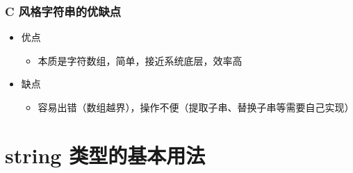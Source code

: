 \begin{frame}[fragile]
    \frametitle{C 风格字符串的优缺点}

    \begin{itemize}
        \item 优点
        
        \begin{itemize}
            \item 本质是字符数组，简单，接近系统底层，效率高
        \end{itemize}

        \item 缺点
        
        \begin{itemize}
            \item 容易出错（数组越界），操作不便（提取子串、替换子串等需要自己实现）
        \end{itemize}

    \end{itemize}

\end{frame}


\section{string 类型的基本用法}

